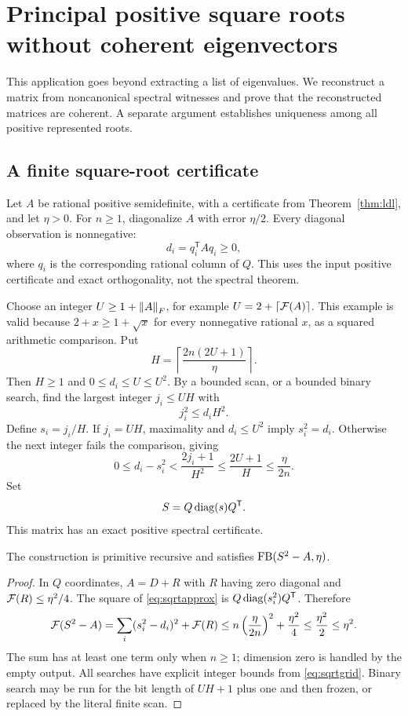 \section{Principal positive square roots without coherent eigenvectors}
\label{sec:squareroots}

This application goes beyond extracting a list of eigenvalues. We reconstruct a matrix from noncanonical spectral witnesses and prove that the reconstructed matrices are coherent. A separate argument establishes uniqueness among all positive represented roots.

\subsection{A finite square-root certificate}

Let $A$ be rational positive semidefinite, with a certificate from Theorem~\ref{thm:ldl}, and let $\eta>0$. For $n\ge1$, diagonalize $A$ with error $\eta/2$. Every diagonal observation is nonnegative:
\[
 d_i=q_i^{\mathsf T}Aq_i\ge0,
\]
where $q_i$ is the corresponding rational column of $Q$. This uses the input positive certificate and exact orthogonality, not the spectral theorem.

Choose an integer $U\ge1+\left\lVert A\right\rVert_F$, for example
$U=2+\lceil\mathcal F(A)\rceil$. This example is valid because $2+x\ge1+\sqrt{x}$ for every nonnegative rational $x$, as a squared arithmetic comparison. Put
\begin{equation}
 H=\left\lceil\frac{2n(2U+1)}{\eta}\right\rceil.
 \label{eq:sqrtgrid}
\end{equation}
Then $H\ge1$ and $0\le d_i\le U\le U^2$. By a bounded scan, or a bounded binary search, find the largest integer $j_i\le UH$ with
\[
 j_i^2\le d_iH^2.
\]
Define $s_i=j_i/H$. If $j_i=UH$, maximality and $d_i\le U^2$ imply $s_i^2=d_i$. Otherwise the next integer fails the comparison, giving
\[
 0\le d_i-s_i^2<\frac{2j_i+1}{H^2}
 \le\frac{2U+1}{H}\le\frac{\eta}{2n}.
\]
Set
\begin{equation}
 S=Q\operatorname{diag}(s)Q^{\mathsf T}. \label{eq:sqrtapprox}
\end{equation}
This matrix has an exact positive spectral certificate.

\begin{proposition}
\label{prop:sqrtproducer}
The construction is primitive recursive and satisfies $\operatorname{FB}(S^2-A,\eta)$.
\end{proposition}
\begin{proof}
In $Q$ coordinates, $A=D+R$ with $R$ having zero diagonal and $\mathcal F(R)\le\eta^2/4$. The square of \eqref{eq:sqrtapprox} is $Q\operatorname{diag}(s_i^2)Q^{\mathsf T}$. Therefore
\[
 \mathcal F(S^2-A)
 =\sum_i(s_i^2-d_i)^2+\mathcal F(R)
 \le n\left(\frac{\eta}{2n}\right)^2+\frac{\eta^2}{4}
 \le\frac{\eta^2}{2}\le\eta^2.
\]
The sum has at least one term only when $n\ge1$; dimension zero is handled by the empty output. All searches have explicit integer bounds from \eqref{eq:sqrtgrid}. Binary search may be run for the bit length of $UH+1$ plus one and then frozen, or replaced by the literal finite scan.
\end{proof}

